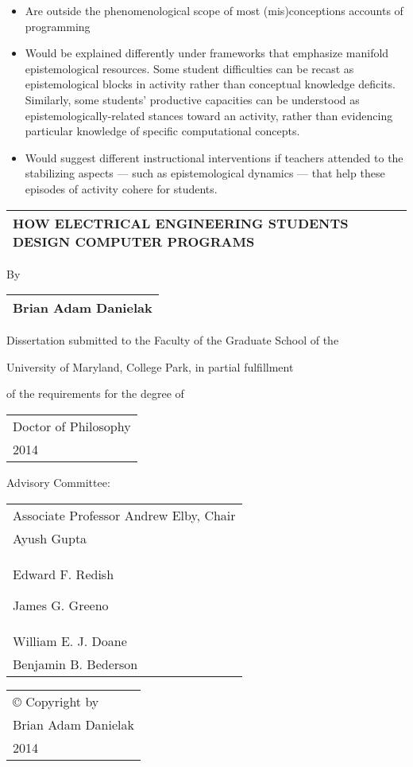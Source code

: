 \begin{itemize}
\item
  Are outside the phenomenological scope of most (mis)conceptions
  accounts of programming
\item
  Would be explained differently under frameworks that emphasize
  manifold epistemological resources. Some student difficulties can be
  recast as epistemological blocks in activity rather than conceptual
  knowledge deficits. Similarly, some students' productive capacities
  can be understood as epistemologically-related stances toward an
  activity, rather than evidencing particular knowledge of specific
  computational concepts.
\item
  Would suggest different instructional interventions if teachers
  attended to the stabilizing aspects --- such as epistemological
  dynamics --- that help these episodes of activity cohere for students.
\end{itemize}

\begin{longtable}[]{@{}l@{}}
\toprule
HOW ELECTRICAL ENGINEERING STUDENTS DESIGN COMPUTER
PROGRAMS\tabularnewline
\bottomrule
\end{longtable}

By

\begin{longtable}[]{@{}l@{}}
\toprule
Brian Adam Danielak\tabularnewline
\bottomrule
\end{longtable}

Dissertation submitted to the Faculty of the Graduate School of the

University of Maryland, College Park, in partial fulfillment

of the requirements for the degree of

\begin{longtable}[]{@{}l@{}}
\toprule
Doctor of Philosophy\tabularnewline
2014\tabularnewline
\bottomrule
\end{longtable}

Advisory Committee:

\begin{longtable}[]{@{}l@{}}
\toprule
Associate Professor Andrew Elby, Chair\tabularnewline
Ayush Gupta\tabularnewline
Edward F. Redish

James G. Greeno\tabularnewline
William E. J. Doane\tabularnewline
Benjamin B. Bederson\tabularnewline
\bottomrule
\end{longtable}

\begin{longtable}[]{@{}l@{}}
\toprule
© Copyright by\tabularnewline
Brian Adam Danielak\tabularnewline
2014\tabularnewline
\bottomrule
\end{longtable}

